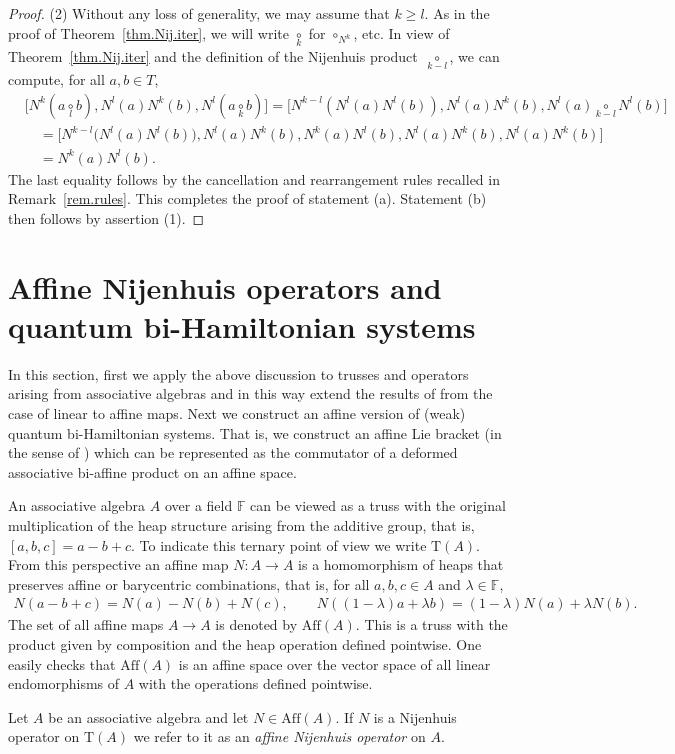 \documentclass[pdftex]{sigma}
\numberwithin{equation}{section}
\newcommand{\F}{\mathbb F}
\def\nij#1{{\underset{#1}{\circ}}}
\begin{document}
\begin{proof}
 (2) Without any loss of generality, we may assume that $k\geq l$. As in the proof of Theorem~\ref{thm.Nij.iter}, we will write $\nij k$ for $\circ_{N^k}$, etc. In view of Theorem~\ref{thm.Nij.iter} and the definition of the Nijenhuis product~$\nij {k-l}$, we can compute, for all $a,b\in T$,
 \begin{align*}
 &\big[N^k(a\nij lb), N^l(a)N^k(b), N^l(a\nij k b)\big] = \big[N^{k-l}(N^l(a)N^l(b)),N^l(a)N^k(b), N^l(a)\nij {k-l} N^l(b) \big]\\
 &\quad= \big[N^{k-l}\big(N^l(a)N^l(b)\big),N^l(a)N^k(b), N^k(a)N^l(b), N^l(a)N^k(b), N^l(a)N^k(b)\big]\\
 &\quad= N^k(a)N^l(b).
 \end{align*}
The last equality follows by the cancellation and rearrangement rules recalled in Remark~\ref{rem.rules}. This completes the proof of statement (a). Statement (b) then follows by assertion (1).
\end{proof}


\section[Affine Nijenhuis operators and quantum bi-Hamiltonian systems]{Affine Nijenhuis operators and \\
quantum bi-Hamiltonian systems}\label{five}
In this section, first we apply the above discussion to trusses and operators arising from associative algebras and in this way extend the results of \cite{4} from the case of linear to affine maps. Next we construct an affine version of (weak) quantum bi-Hamiltonian systems. That is, we construct an affine Lie bracket (in the sense of \cite[Definition~1]{GraGra:Lie}) which can be represented as the commutator of a deformed associative bi-affine product on an affine space.

An associative algebra $A$ over a field $\F$ can be viewed as a truss with the original multiplication of the heap structure arising from the additive group, that is, $[a,b,c] = a-b+c$. To indicate this ternary point of view we write $\mathrm{T}(A)$. From this perspective an affine map $N\colon A\to A$ is a homomorphism of heaps that preserves affine or barycentric combinations, that is, for all $a,b,c\in A$ and $\lambda\in \F$,
\begin{align}\label{n.aff}
 N(a -b +c) = N(a)-N(b)+N(c), \qquad N((1-\lambda)a +\lambda b ) = (1-\lambda)N(a) + \lambda N(b).\!\!\!
\end{align}
The set of all affine maps $A\to A$ is denoted by $\mathrm{Aff}(A)$. This is a truss with the product given by composition and the heap operation defined pointwise. One easily checks that $\mathrm{Aff}(A)$ is an affine space over the vector space of all linear endomorphisms of $A$ with the operations defined pointwise.
\begin{Definition}\label{def.aff.Nij}
Let $A$ be an associative algebra and let $N\in \mathrm{Aff}(A)$. If $N$ is a Nijenhuis op\-er\-a\-tor on $\mathrm{T}(A)$ we refer to it as an \textit{affine Nijenhuis operator} on $A$.
\end{Definition}
\end{document}
